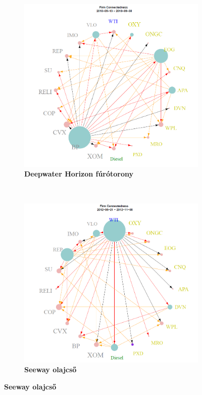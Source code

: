 \documentclass[12pt,bibliography=totoc]{article}
\begin{document}
\begin{figure}[H]
\begin{subfigure}{.5\linewidth}
\end{subfigure}%
\begin{subfigure}{.5\linewidth}
\centering
\includegraphics[width=\linewidth]{bp2}
\caption{\textbf{Deepwater Horizon fúrótorony}}
\end{subfigure}\\[1ex]
\begin{subfigure}{.5\linewidth}
\centering
\includegraphics[width=\linewidth]{wti}
\caption{\textbf{Seeway olajcső}}
\end{subfigure}
\end{figure}
\end{document}
